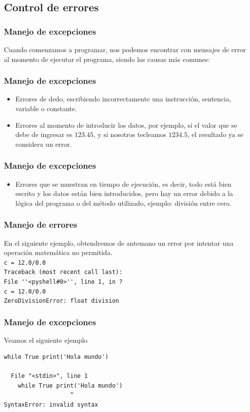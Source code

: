 \subsection{Control de errores}
\begin{frame}[fragile]
\frametitle{Manejo de excepciones}
Cuando comenzamos a programar, nos podemos encontrar con mensajes de error al momento de ejecutar el programa, siendo las causas más comunes:
\end{frame}
\begin{frame}
\frametitle{Manejo de excepciones}
\begin{itemize}[<+->]
\item Errores de dedo, escribiendo incorrectamente una instrucción, sentencia, variable o constante.
\item Errores al momento de introducir los datos, por ejemplo, si el valor que se debe de ingresar es $123.45$, y si nosotros tecleamos $1234.5$, el resultado ya se considera un error.
\end{itemize}
\end{frame}
\begin{frame}
\frametitle{Manejo de excepciones}
\begin{itemize}[<+->]
\item Errores que se muestran en tiempo de ejecución, es decir, todo está bien escrito y los datos están bien introducidos, pero hay un error debido a la lógica del programa o del método utilizado, ejemplo: división entre cero.
\end{itemize}
\end{frame}
\begin{frame}[fragile]
\frametitle{Manejo de errores}
En el siguiente ejemplo, obtendremos de antemano un error por intentar una operación matemática no permitida.
\\
\bigskip
\verb|c = 12.0/0.0| \\
\pause
\verb|Traceback (most recent call last):| \\
\verb|File ''<pyshell#0>'', line 1, in ?| \\
\verb|c = 12.0/0.0| \\
\verb|ZeroDivisionError: float division|
\end{frame}
\begin{frame}[fragile]
\frametitle{Manejo de excepciones}
Veamos el siguiente ejemplo
\begin{lstlisting}
while True print('Hola mundo')

  File "<stdin>", line 1
    while True print('Hola mundo')
                   ^
SyntaxError: invalid syntax
\end{lstlisting}
\end{frame}
